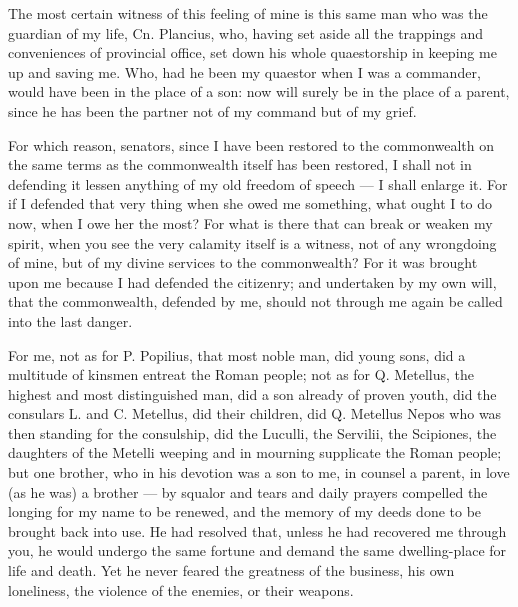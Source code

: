  The most certain witness of this feeling of mine is this same man who was the guardian of my life, Cn. Plancius, who, having set aside all the trappings and conveniences of provincial office, set down his whole quaestorship in keeping me up and saving me. Who, had he been my quaestor when I was a commander, would have been in the place of a son: now will surely be in the place of a parent, since he has been the partner not of my command but of my grief.

 For which reason, senators, since I have been restored to the commonwealth on the same terms as the commonwealth itself has been restored, I shall not in defending it lessen anything of my old freedom of speech --- I shall enlarge it. For if I defended that very thing when she owed me something, what ought I to do now, when I owe her the most? For what is there that can break or weaken my spirit, when you see the very calamity itself is a witness, not of any wrongdoing of mine, but of my divine services to the commonwealth? For it was brought upon me because I had defended the citizenry; and undertaken by my own will, that the commonwealth, defended by me, should not through me again be called into the last danger.

 For me, not as for P. Popilius, that most noble man, did young sons, did a multitude of kinsmen entreat the Roman people; not as for Q. Metellus, the highest and most distinguished man, did a son already of proven youth, did the consulars L. and C. Metellus, did their children, did Q. Metellus Nepos who was then standing for the consulship, did the Luculli, the Servilii, the Scipiones, the daughters of the Metelli weeping and in mourning supplicate the Roman people; but one brother, who in his devotion was a son to me, in counsel a parent, in love (as he was) a brother --- by squalor and tears and daily prayers compelled the longing for my name to be renewed, and the memory of my deeds done to be brought back into use. He had resolved that, unless he had recovered me through you, he would undergo the same fortune and demand the same dwelling-place for life and death. Yet he never feared the greatness of the business, his own loneliness, the violence of the enemies, or their weapons.

